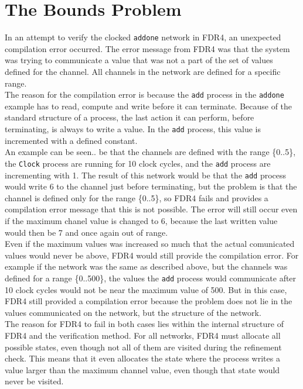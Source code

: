 \section{The Bounds Problem}
In an attempt to verify the clocked \texttt{addone} network in FDR4, an unexpected compilation error occurred. The error message from FDR4 was that the system was trying to communicate a value that was not a part of the set of values defined for the channel. All channels in the network are defined for a specific range. \\

The reason for the compilation error is because the \texttt{add} process in the \texttt{addone} example has to read, compute and write before it can terminate. Because of the standard structure of a process, the last action it can perform, before terminating, is always to write a value. In the \texttt{add} process, this value is incremented with a defined constant.\\


An example can be seen..
be that the channels are defined with the range \{0..5\}, the \texttt{Clock} process are running for 10 clock cycles, and the \texttt{add} process are incrementing with 1.
The result of this network would be that the \texttt{add} process would write 6 to the channel just before terminating, but the problem is that the channel is defined only for the range \{0..5\}, so FDR4 fails and provides a compilation error message that this is not possible. The error will still occur even if the maximum chanel value is changed to 6, because the last written value would then be 7 and once again out of range. \\

Even if the maximum values was increased so much that the actual comunicated values would never be above, FDR4 would still provide the compilation error.
For example if the network was the same as described above, but the channels was defined for a range \{0..500\}, the values the \texttt{add} process would communicate after 10 clock cycles would not be near the maximum value of 500. But in this case, FDR4 still provided a compilation error because the problem does not lie in the values communicated on the network, but the structure of the network. \\

The reason for FDR4 to fail in both cases lies within the internal structure of FDR4 and the verification method. For all networks, FDR4 must allocate all possible states, even though not all of them are visited during the refinement check. This means that it even allocates the state where the process writes a value larger than the maximum channel value, even though that state would never be visited.\\

